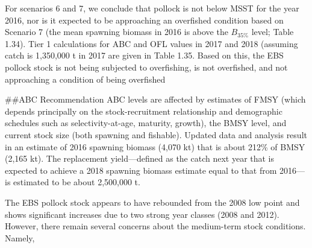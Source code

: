 For scenarios 6 and 7, we conclude that pollock is not below MSST for
the year 2016, nor is it expected to be approaching an overfished
condition based on Scenario 7 (the mean spawning biomass in 2016 is
above the \(B_{35\%}\) level; Table 1.34). Tier 1 calculations for ABC
and OFL values in 2017 and 2018 (assuming catch is 1,350,000 t in 2017
are given in Table 1.35. Based on this, the EBS pollock stock is not
being subjected to overfishing, is not overfished, and not approaching a
condition of being overfished

\#\#ABC Recommendation ABC levels are affected by estimates of FMSY
(which depends principally on the stock-recruitment relationship and
demographic schedules such as selectivity-at-age, maturity, growth), the
BMSY level, and current stock size (both spawning and fishable). Updated
data and analysis result in an estimate of 2016 spawning biomass (4,070
kt) that is about 212\% of BMSY (2,165 kt). The replacement
yield---defined as the catch next year that is expected to achieve a
2018 spawning biomass estimate equal to that from 2016---is estimated to
be about 2,500,000 t.

The EBS pollock stock appears to have rebounded from the 2008 low point
and shows significant increases due to two strong year classes (2008 and
2012). However, there remain several concerns about the medium-term
stock conditions. Namely,

